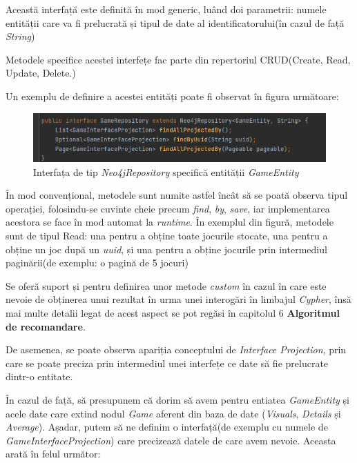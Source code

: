 \documentclass[12pt,a4paper]{report}
\begin{document}
Această interfață este definită în mod generic, luând doi parametrii: numele entității care va fi prelucrată și tipul de date al identificatorului(în cazul de față \emph{String})

Metodele specifice acestei interfețe fac parte din repertoriul CRUD(Create, Read, Update, Delete.)

Un exemplu de definire a acestei entități poate fi observat în figura următoare:

\begin{figure}[H]
\centering
\caption{}
\includegraphics[scale = 0.8]{exemplu_19_repository}
\caption*{Interfața de tip \emph{Neo4jRepository} specifică entității \emph{GameEntity}}
\end{figure}

În mod convențional, metodele sunt numite astfel încât să se poată observa tipul operației, folosindu-se cuvinte cheie precum \emph{find}, \emph{by}, \emph{save}, iar implementarea acestora se face în mod automat la \emph{runtime}. În exemplul din figură, metodele sunt de tipul Read: una pentru a obține toate jocurile stocate, una pentru a obține un joc după un \emph{uuid}, și una pentru a obține jocurile prin intermediul paginării(de exemplu: o pagină de 5 jocuri)

Se oferă suport și pentru definirea unor metode \emph{custom} în cazul în care este nevoie de obținerea unui rezultat în urma unei interogări în limbajul \emph{Cypher}, însă mai multe detalii legat de acest aspect se pot regăsi în capitolul 6 \textbf{Algoritmul de recomandare}.

De asemenea, se poate observa apariția conceptului de \emph{Interface Projection}, prin care se poate preciza prin intermediul unei interfețe ce date să fie prelucrate dintr-o entitate. 

În cazul de față, să presupunem că dorim să avem pentru entiatea \emph{GameEntity} și acele date care extind nodul \emph{Game} aferent din baza de date (\emph{Visuals}, \emph{Details} și \emph{Average}). Așadar, putem să ne definim o interfață(de exemplu cu numele de \emph{GameInterfaceProjection}) care precizează datele de care avem nevoie. Aceasta arată în felul următor:
\end{document}
